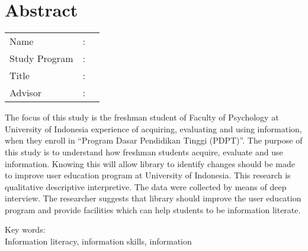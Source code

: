 %
%
%

\chapter*{Abstract}

\vspace*{0.2cm}
{
	\setlength{\parindent}{0pt}
	
	\begin{tabular}{@{}l l p{10cm}}
		Name&: & \penulis \\
		Study Program&: & \program \\
		Title&: & \judulInggris \\
		Advisor&: & \pembimbing \\
	\end{tabular}

	\bigskip
	\bigskip

	The focus of this study is the freshman student of Faculty of Psychology at University of
	Indonesia experience of acquiring, evaluating and using information, when they enroll in
	“Program Dasar Pendidikan Tinggi (PDPT)”. The purpose of this study is to understand
	how freshman students acquire, evaluate and use information. Knowing this will allow
	library to identify changes should be made to improve user education program at
	University of Indonesia. This research is qualitative descriptive interpretive. The data
	were collected by means of deep interview. The researcher suggests that library should
	improve the user education program and provide facilities which can help students to be
	information literate.

	\bigskip

	Key words:\\
	Information literacy, information skills, information
}

\newpage